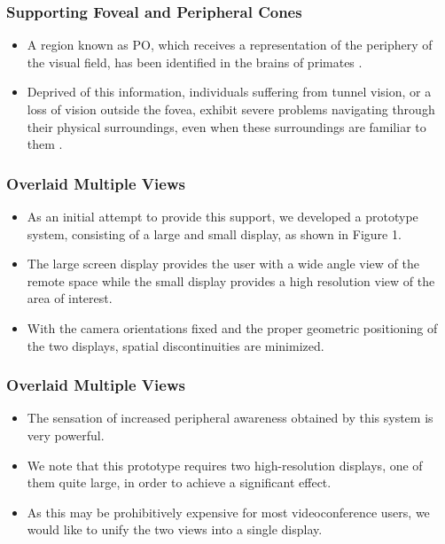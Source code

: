 \documentclass{beamer}
\begin{document}
\begin{frame}
\frametitle{Supporting Foveal and Peripheral Cones}

\begin{itemize}
\item A region known as PO, which receives a representation of the periphery of the visual field, has been identified in the brains of primates .
\item Deprived of this information, individuals suffering from tunnel vision, or a loss of vision outside the fovea, exhibit severe problems navigating through their physical surroundings, even when these surroundings are familiar to them .
\end{itemize}

\end{frame}

\begin{frame}
\frametitle{Overlaid Multiple Views}

\begin{itemize}
\item As an initial attempt to provide this support, we developed a prototype system, consisting of a large and small display, as shown in Figure 1.
\item The large screen display provides the user with a wide angle view of the remote space while the small display provides a high resolution view of the area of interest.
\item With the camera orientations fixed and the proper geometric positioning of the two displays, spatial discontinuities are minimized.
\end{itemize}

\end{frame}

\begin{frame}
\frametitle{Overlaid Multiple Views}

\begin{itemize}
\item The sensation of increased peripheral awareness obtained by this system is very powerful.
\item We note that this prototype requires two high-resolution displays, one of them quite large, in order to achieve a significant effect.
\item As this may be prohibitively expensive for most videoconference users, we would like to unify the two views into a single display.
\end{itemize}

\end{frame}
\end{document}
